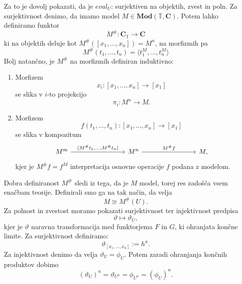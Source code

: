 \documentclass[../kategoricna_logika.tex]{subfiles}
\begin{document}
\begin{dokaz}
Za to je dovolj pokazati, da je $eval_U$:
surjektiven na objektih, zvest in poln.
Za surjektivnost denimo, da imamo model
$M \in \mathbf{Mod}(\mathbb{T}, \mathbf{C})$. Potem lahko definiramo funktor
$$M^{\#} : \mathbf{C}_\mathbb{T} \to \mathbf{C}$$
ki na objektih deluje kot $M^{\#}([x_1, \ldots, x_n]) = M^n$, na
morfizmih pa
$$M^{\#}(t_1, \ldots, t_n) = \langle t_1^M, \ldots, t_n^M \rangle$$
%
Bolj natančno, je $M^{\#}$ na morfizmih definiran induktivno:
\begin{enumerate}
\item Morfizem $$x_i : [x_1, \ldots, x_n] \to [x_1]$$ se slika v
  $i$-to projekcijo $$\pi_i : M^n \to M.$$
\item Morfizem $$f(t_1, \ldots, t_n) : [x_1, \ldots, x_n] \to [x_1]$$
  se slika v kompozitum
\begin{equation*}
    \begin{tikzcd}[column sep = 8em]
      M^m \ar[r, "{\langle M^{\#}t_1, \ldots, M^{\#}t_n \rangle}"] & M^n \ar[r,
      "{M^{\#}f}"] & M,
    \end{tikzcd}
  \end{equation*}
  kjer je $M^{\#}f = f^M$ interpretacija osnovne operacije $f$ podana
  z modelom.
\end{enumerate}
%
Dobra definiranost $M^{\#}$ sledi iz tega, da je $M$ model, torej res zadošča vsem enačbam teorije.
Definirali smo ga na tak način, da velja
$$M \cong M^{\#}(U).$$
%
Za polnost in zvestost moramo pokazati surjektivnost ter injektivnost
predpisa $$\vartheta \mapsto \vartheta_U,$$
kjer je $\vartheta$ naravna transformacija med funktorjema $F$ in $G$, ki ohranjata končne limite.
Za surjektivnost definiramo:
$$\vartheta_{[x_1, \ldots, x_n]} := h^n.$$
Za injektivnost denimo da velja $\vartheta_U = \phi_U $.
Potem zaradi ohranjanja končnih produktov dobimo
\[ (\vartheta_U)^n = \vartheta_{U^n} = \phi_{U^n} = (\phi_U)^n. \]


\end{dokaz}
\end{document}
